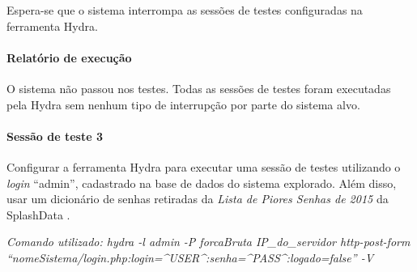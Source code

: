 \documentclass[
    12pt,               %
    openright,          %
    oneside,            %
    a4paper,            %
    section=TITLE,     %
    english,            %
    french,             %
    spanish,            %
    brazil              %
    ]{abntex2}
\newcommand{\citep}{\cite}
\begin{document}
Espera-se que o sistema interrompa as sessões de testes configuradas na ferramenta Hydra.



\paragraph*{Relatório de execução}

O sistema não passou nos testes. Todas as sessões de testes foram executadas pela Hydra sem nenhum tipo de interrupção por parte do sistema alvo.





\paragraph*{Sessão de teste 3}

Configurar a ferramenta Hydra para executar uma sessão de testes utilizando o \emph{login} \textquotedblleft{}admin\textquotedblright{}, cadastrado na base de dados do sistema explorado. Além disso, usar um dicionário de senhas retiradas da \emph{Lista de Piores Senhas de 2015} da SplashData \citep{62203}.


\emph{Comando utilizado: hydra -l admin -P forcaBruta IP\_do\_servidor http-post-form \textquotedblleft{}nomeSistema/login.php:login=\^{}USER\^{}:senha=\^{}PASS\^{}:logado=false\textquotedblright{} -V}
\end{document}
